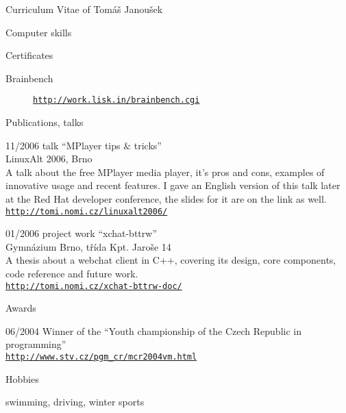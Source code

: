 \documentclass[12pt,a4paper,english,pdftex]{article}
\begin{document}
\begin{cv}{Curriculum Vitae of Tomáš Janoušek}
\begin{cvlist}{Computer skills}
        \item[Certificates]
            \begin{description}
                \item[Brainbench]
                    \href{http://work.lisk.in/brainbench.cgi}{\texttt{http://work.lisk.in/brainbench.cgi}}
            \end{description}
    \end{cvlist}

    \goodbreak
    \begin{cvlist}{Publications, talks}
        \item[11/2006]
            talk ``MPlayer tips \& tricks'' \\
            LinuxAlt 2006, Brno \\[1mm]
	    A talk about the free MPlayer media player, it's pros and cons,
	    examples of innovative usage and recent features. I gave an
	    English version of this talk later at the Red Hat developer
	    conference, the slides for it are on the link as well. \\[1mm]
            \href{http://tomi.nomi.cz/linuxalt2006/}{\texttt{http://tomi.nomi.cz/linuxalt2006/}}
        \item[01/2006]
            project work ``xchat-bttrw'' \\
            Gymnázium Brno, třída Kpt. Jaroše 14 \\[1mm]
	    A thesis about a webchat client in C++, covering its design, core
	    components, code reference and future work. \\[1mm]
            \href{http://tomi.nomi.cz/xchat-bttrw-doc/}{\texttt{http://tomi.nomi.cz/xchat-bttrw-doc/}}
    \end{cvlist}

    \goodbreak
    \begin{cvlist}{Awards}
        \item[06/2004]
            Winner of the ``Youth championship of the Czech Republic in
            programming'' \\
            \href{http://www.stv.cz/pgm_cr/mcr2004vm.html}{\texttt{http://www.stv.cz/pgm\_cr/mcr2004vm.html}}
    \end{cvlist}

    \goodbreak
    \begin{cvlist}{Hobbies}
        \item swimming, driving, winter sports
    \end{cvlist}

    \enlargethispage{0.3cm}
    \date{\today}
\end{cv}
\end{document}
